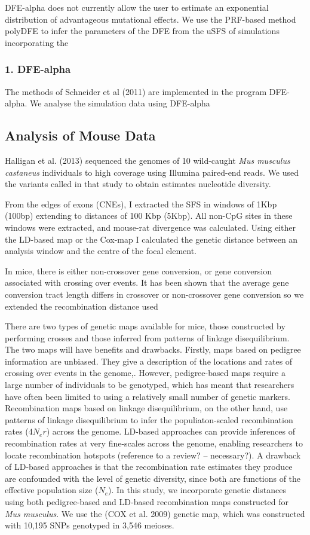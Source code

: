 \documentclass{article}
\begin{document}
DFE-alpha does not currently allow the user to estimate an exponential distribution of advantageous mutational effects. We use the PRF-based method polyDFE to infer the parameters of the DFE from the uSFS of simulations incorporating the 

		\subsubsection*{1. DFE-alpha}
		The methods of Schneider et al (2011) are implemented in the program DFE-alpha. We analyse the simulation data using DFE-alpha

	\subsection*{Analysis of Mouse Data}

Halligan et al. (2013) sequenced the genomes of 10 wild-caught \emph{Mus musculus castaneus} individuals to high coverage using Illumina paired-end reads. We used the variants called in that study to obtain estimates nucleotide diversity.

From the edges of exons (CNEs), I extracted the SFS in windows of 1Kbp (100bp) extending to distances of 100 Kbp (5Kbp). All non-CpG sites in these windows were extracted, and mouse-rat divergence was calculated. Using either the LD-based map or the Cox-map I calculated the genetic distance between an analysis window and the centre of the focal element. 

	In mice, there is either non-crossover gene conversion, or gene conversion associated with crossing over events. It has been shown that the average gene conversion tract length differs in crossover or non-crossover gene conversion so we extended the recombination distance used 

	There are two types of genetic maps available for mice, those constructed by performing crosses and those inferred from patterns of linkage disequilibrium. The two maps will have benefits and drawbacks. Firstly, maps based on pedigree information are unbiased. They give a description of the locations and rates of crossing over events in the genome,. However, pedigree-based maps require a large number of individuals to be genotyped, which has meant that researchers have often been limited to using a relatively small number of genetic markers. Recombination maps based on linkage disequilibrium, on the other hand, use patterns of linkage disequilibrium to infer the populiaton-scaled recombination rates ($4N_er$) across the genome. LD-based approaches can provide inferences of recombination rates at very fine-scales across the genome, enabling researchers to locate recombination hotspots (reference to a review? – necessary?). A drawback of LD-based approaches is that the recombination rate estimates they produce are confounded with the level of genetic diversity, since both are functions of the effective population size ($N_e$). In this study, we incorporate genetic distances using both pedigree-based and LD-based recombination maps constructed for \emph{Mus musculus}. We use the (COX et al. 2009) genetic map, which was constructed with 10,195 SNPs genotyped in 3,546 meioses. 
\end{document}
